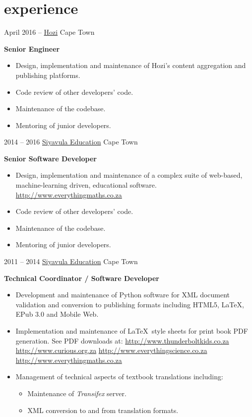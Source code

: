 \documentclass[]{friggeri-cv} %
\begin{document}
\section{experience}
\begin{entrylist}

    \entry
    {April 2016 -- }
    {\href{http://www.hozi.co.za}{Hozi}}
    {Cape Town}
    {%
    \textbf{Senior Engineer}
    \begin{itemize}
    \setlength{\itemsep}{5pt}
    \item Design, implementation and maintenance of Hozi's content aggregation and publishing platforms.
    \item Code review of other developers' code.
    \item Maintenance of the codebase.
    \item Mentoring of junior developers.
    \end{itemize}
    }

\entry
{2014 -- 2016}
{\href{http://www.siyavula.com}{Siyavula Education}}
{Cape Town}
{%
\textbf{Senior Software Developer}
\begin{itemize}
\setlength{\itemsep}{5pt}
\item Design, implementation and maintenance of a complex suite of web-based, machine-learning driven, educational software.
    \subitem \url{http://www.everythingmaths.co.za}
    \item Code review of other developers' code.
    \item Maintenance of the codebase.
    \item Mentoring of junior developers.
\end{itemize}
}
\entry
{2011 -- 2014 }
{\href{http://www.siyavula.com}{Siyavula Education}}
{Cape Town}
{%
\textbf{Technical Coordinator / Software Developer}
\begin{itemize}
\setlength{\itemsep}{5pt}
\item Development and maintenance of Python software for XML document validation and conversion to publishing formats including HTML5, \LaTeX, EPub 3.0 and Mobile Web.
\item Implementation and maintenance of \LaTeX~style sheets for print book PDF generation. See PDF downloads at:
    \subitem \url{http://www.thunderboltkids.co.za}
    \subitem \url{http://www.curious.org.za}
    \subitem \url{http://www.everythingscience.co.za}
    \subitem \url{http://www.everythingmaths.co.za}

\item Management of technical aspects of textbook translations including:
\begin{itemize}
    \renewcommand{\labelitemii}{$\cdot$}
    \item Maintenance of \emph{Transifex} server.
    \item XML conversion to and from translation formats.
\end{itemize}


\end{itemize}}
\end{entrylist}
\end{document}
